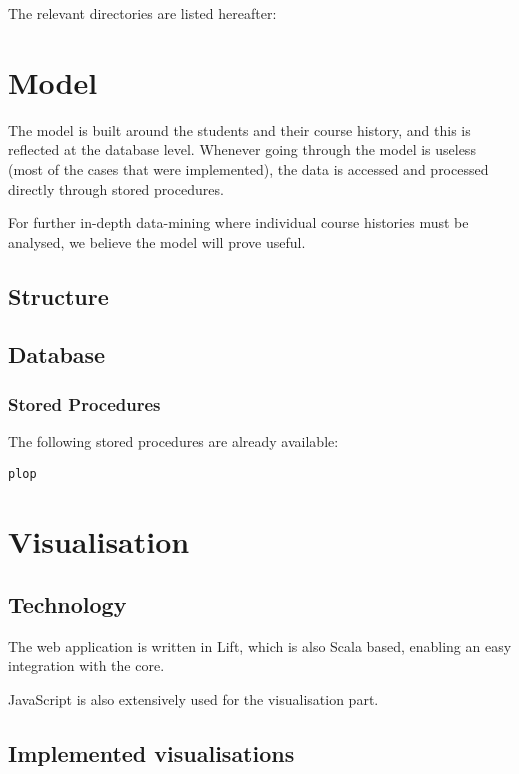 The relevant directories are listed hereafter:


\chapter{Model}
The model is built around the students and their course history, and this is reflected at the database level. Whenever going through the model is useless (most of the cases that were implemented), the data is accessed and processed directly through stored procedures.

For further in-depth data-mining where individual course histories must be analysed, we believe the model will prove useful.
\section{Structure}

\section{Database}

\subsection{Stored Procedures}
The following stored procedures are already available:

\begin{description}
\item\verb|plop|
\end{description}

\chapter{Visualisation}

\section{Technology}
The web application is written in Lift, which is also Scala based, enabling an easy integration with the core.

JavaScript is also extensively used for the visualisation part.

\section{Implemented visualisations}



